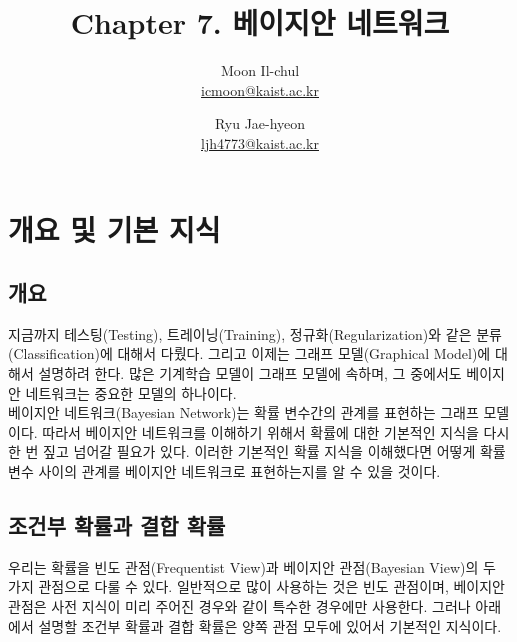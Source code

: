 \documentclass[a4paper]{oblivoir}
\author{Moon Il-chul \\ \href{mailto:icmoon@kaist.ac.kr}{icmoon@kaist.ac.kr} 
   \and Ryu Jae-hyeon
 \\ \href{mailto:ljh4773@kaist.ac.kr}{ljh4773@kaist.ac.kr} }
\title{Chapter 7. 베이지안 네트워크}
\begin{document}
\maketitle
\tableofcontents

\section{개요 및 기본 지식}

\subsection{개요}


지금까지 테스팅(Testing), 트레이닝(Training), 정규화(Regularization)와 같은 분류(Classification)에 대해서 다뤘다. 그리고 이제는 그래프 모델(Graphical Model)에 대해서 설명하려 한다. 많은 기계학습 모델이 그래프 모델에 속하며, 그 중에서도 베이지안 네트워크는 중요한 모델의 하나이다. \\

베이지안 네트워크(Bayesian Network)는 확률 변수간의 관계를 표현하는 그래프 모델이다. 따라서 베이지안 네트워크를 이해하기 위해서 확률에 대한 기본적인 지식을 다시 한 번 짚고 넘어갈 필요가 있다. 이러한 기본적인 확률 지식을 이해했다면 어떻게 확률 변수 사이의 관계를 베이지안 네트워크로 표현하는지를 알 수 있을 것이다.   

\subsection{조건부 확률과 결합 확률}


\indent 우리는 확률을 빈도 관점(Frequentist View)과 베이지안 관점(Bayesian View)의 두 가지 관점으로 다룰 수 있다. 일반적으로 많이 사용하는 것은 빈도 관점이며, 베이지안 관점은 사전 지식이 미리 주어진 경우와 같이 특수한 경우에만 사용한다. 그러나 아래에서 설명할 조건부 확률과 결합 확률은 양쪽 관점 모두에 있어서 기본적인 지식이다. \\
\end{document}
